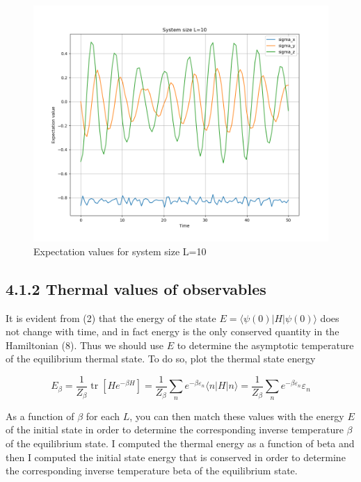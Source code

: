 \documentclass[12pt]{article}
\begin{document}
\begin{figure}
    \centering
    \includegraphics[width=\textwidth]{Expectation_values_L_10.png}
    \caption{Expectation values for system size L=10}
\end{figure}


\subsection*{4.1.2 Thermal values of observables}
It is evident from (2) that the energy of the state $E=\langle\psi(0)|H| \psi(0)\rangle$ does not change with time, and in fact energy is the only conserved quantity in the Hamiltonian (8). Thus we should use $E$ to determine the asymptotic temperature of the equilibrium thermal state. To do so, plot the thermal state energy


\begin{equation*}
E_{\beta}=\frac{1}{Z_{\beta}} \operatorname{tr}\left[H e^{-\beta H}\right]=\frac{1}{Z_{\beta}} \sum_{n} e^{-\beta \varepsilon_{n}}\langle n|H| n\rangle=\frac{1}{Z_{\beta}} \sum_{n} e^{-\beta \varepsilon_{n}} \varepsilon_{n} \tag{10}
\end{equation*}


As a function of $\beta$ for each $L$, you can then match these values with the energy $E$ of the initial state in order to determine the corresponding inverse temperature $\beta$ of the equilibrium state.
\newpage
I computed the thermal energy as a function of beta and then I computed the initial state energy that is conserved in order to determine the corresponding inverse temperature beta of the equilibrium state.
\end{document}
